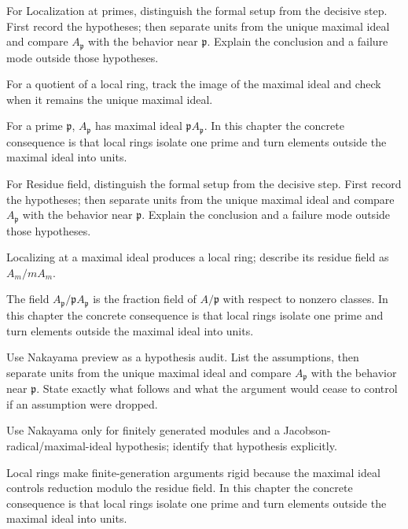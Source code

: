 \begin{exercise}\label{exr:v08-04}
For Localization at primes, distinguish the formal setup from the decisive step. First record the hypotheses; then separate units from the unique maximal ideal and compare \(A_{\mathfrak p}\) with the behavior near \(\mathfrak p\). Explain the conclusion and a failure mode outside those hypotheses.
\end{exercise}
\begin{hint}
For a quotient of a local ring, track the image of the maximal ideal and check when it remains the unique maximal ideal.
\end{hint}
\begin{solution}
For a prime $\mathfrak p$, $A_{\mathfrak p}$ has maximal ideal $\mathfrak p A_{\mathfrak p}$. In this chapter the concrete consequence is that local rings isolate one prime and turn elements outside the maximal ideal into units.
\end{solution}

\begin{exercise}\label{exr:v08-05}
For Residue field, distinguish the formal setup from the decisive step. First record the hypotheses; then separate units from the unique maximal ideal and compare \(A_{\mathfrak p}\) with the behavior near \(\mathfrak p\). Explain the conclusion and a failure mode outside those hypotheses.
\end{exercise}
\begin{hint}
Localizing at a maximal ideal produces a local ring; describe its residue field as \(A_m/mA_m\).
\end{hint}
\begin{solution}
The field $A_{\mathfrak p}/\mathfrak p A_{\mathfrak p}$ is the fraction field of $A/\mathfrak p$ with respect to nonzero classes. In this chapter the concrete consequence is that local rings isolate one prime and turn elements outside the maximal ideal into units.
\end{solution}

\begin{exercise}\label{exr:v08-06}
Use Nakayama preview as a hypothesis audit. List the assumptions, then separate units from the unique maximal ideal and compare \(A_{\mathfrak p}\) with the behavior near \(\mathfrak p\). State exactly what follows and what the argument would cease to control if an assumption were dropped.
\end{exercise}
\begin{hint}
Use Nakayama only for finitely generated modules and a Jacobson-radical/maximal-ideal hypothesis; identify that hypothesis explicitly.
\end{hint}
\begin{solution}
Local rings make finite-generation arguments rigid because the maximal ideal controls reduction modulo the residue field. In this chapter the concrete consequence is that local rings isolate one prime and turn elements outside the maximal ideal into units.
\end{solution}


